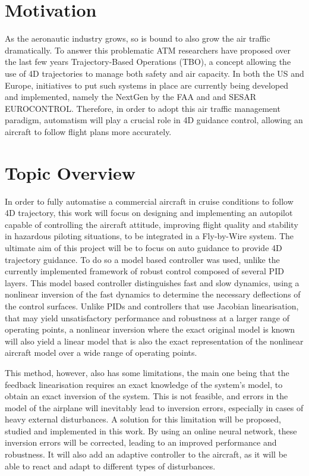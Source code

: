 \section{Motivation}
\label{section:motivation}

As the aeronautic industry grows, so is bound to also grow the air traffic dramatically. To answer this problematic ATM researchers have proposed over the last few years Trajectory-Based Operations (TBO), a concept allowing the use of 4D trajectories to manage both safety and air capacity. In both the US and Europe, initiatives to put such systems in place are currently being developed and implemented, namely the NextGen by the FAA and and SESAR EUROCONTROL. Therefore, in order to adopt this air traffic management paradigm, automatism will play a crucial role in 4D guidance control, allowing an aircraft to follow flight plans more accurately.



\section{Topic Overview}
\label{section:overview}

In order to fully automatise a commercial aircraft in cruise conditions to follow 4D trajectory, this work will focus on designing and implementing an autopilot capable of controlling the aircraft attitude, improving flight quality and stability in hazardous piloting situations, to be integrated in a Fly-by-Wire system. The ultimate aim of this project will be to focus on auto guidance to provide 4D trajectory guidance. To do so a model based controller was used, unlike the currently implemented framework of robust control composed of several PID layers. This model based controller distinguishes fast and slow dynamics, using a nonlinear inversion of the fast dynamics to determine the necessary deflections of the control surfaces. Unlike PIDs and controllers that use Jacobian linearisation, that may yield unsatisfactory performance and robustness at a larger range of operating points, a nonlinear inversion where the exact original model is known will also yield a linear model that is also the exact representation of the nonlinear aircraft model over a wide range of operating points. 

This method, however, also has some limitations, the main one being that the feedback linearisation requires an exact knowledge of the system's model, to obtain an exact inversion of the system. This is not feasible, and errors in the model of the airplane will inevitably lead to inversion errors, especially in cases of heavy external disturbances. A solution for this limitation will be proposed, studied and implemented in this work. By using an online neural network, these inversion errors will be corrected, leading to an improved performance and robustness. It will also add an adaptive controller to the aircraft, as it will be able to react and adapt to different types of disturbances.



